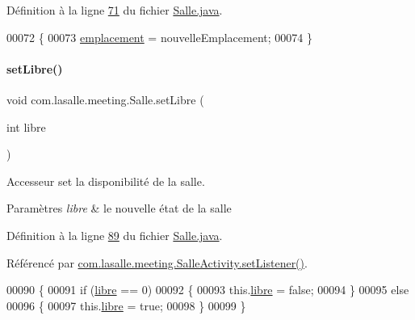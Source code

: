 Définition à la ligne \hyperlink{_salle_8java_source_l00071}{71} du fichier \hyperlink{_salle_8java_source}{Salle.\+java}.


\begin{DoxyCode}
00072     \{
00073         \hyperlink{classcom_1_1lasalle_1_1meeting_1_1_salle_a9e31fc4d4c9125e511db52da3254bcba}{emplacement} = nouvelleEmplacement;
00074     \}
\end{DoxyCode}
\mbox{\label{classcom_1_1lasalle_1_1meeting_1_1_salle_a94c64624d647ec3ec60a9fbeb06948b8}} 
\paragraph{\texorpdfstring{set\+Libre()}{setLibre()}\hspace{0.1cm}{\footnotesize\ttfamily [1/2]}}
{\footnotesize\ttfamily void com.\+lasalle.\+meeting.\+Salle.\+set\+Libre (\begin{DoxyParamCaption}\item[{int}]{libre }\end{DoxyParamCaption})}



Accesseur set la disponibilité de la salle. 


\begin{DoxyParams}{Paramètres}
{\em libre} & le nouvelle état de la salle \\
\hline
\end{DoxyParams}


Définition à la ligne \hyperlink{_salle_8java_source_l00089}{89} du fichier \hyperlink{_salle_8java_source}{Salle.\+java}.



Référencé par \hyperlink{_salle_activity_8java_source_l00132}{com.\+lasalle.\+meeting.\+Salle\+Activity.\+set\+Listener()}.


\begin{DoxyCode}
00090     \{
00091         \textcolor{keywordflow}{if} (\hyperlink{classcom_1_1lasalle_1_1meeting_1_1_salle_a2965cb92b06dcdd28a07fa550259b1c1}{libre} == 0)
00092         \{
00093             this.\hyperlink{classcom_1_1lasalle_1_1meeting_1_1_salle_a2965cb92b06dcdd28a07fa550259b1c1}{libre} = \textcolor{keyword}{false};
00094         \}
00095         \textcolor{keywordflow}{else}
00096         \{
00097             this.\hyperlink{classcom_1_1lasalle_1_1meeting_1_1_salle_a2965cb92b06dcdd28a07fa550259b1c1}{libre} = \textcolor{keyword}{true};
00098         \}
00099     \}
\end{DoxyCode}
\mbox{\label{classcom_1_1lasalle_1_1meeting_1_1_salle_af48c38974e65f48082db016a82afaf89}} 
